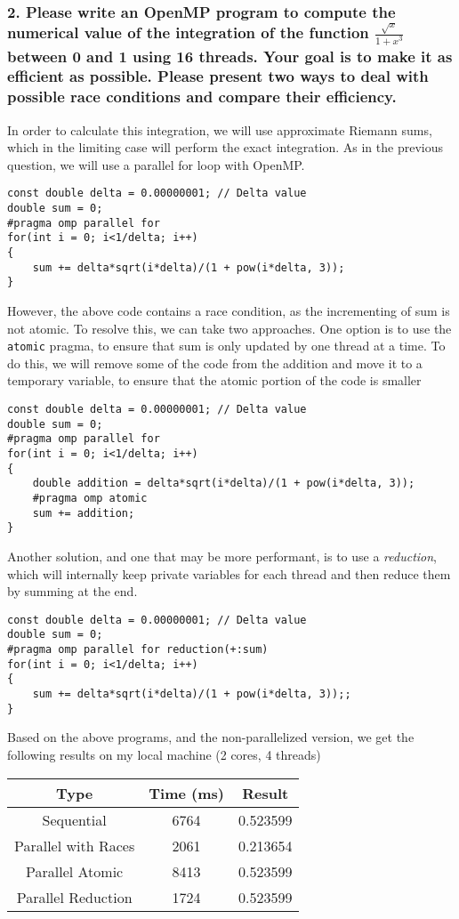 \documentclass[titlepage]{article}
\def\code#1{\texttt{#1}}
\begin{document}
\subsubsection*{2. Please write an OpenMP program to compute the numerical 
value of the integration of the function $\frac{\sqrt{x}}{1+x^3}$ between 0 
and 1 using 16 threads. Your goal is to make it as efficient as possible. 
Please present two ways to deal with possible race conditions and compare 
their efficiency.}
In order to calculate this integration, we will use approximate Riemann sums,
which in the limiting case will perform the exact integration. As in the
previous question, we will use a parallel for loop with OpenMP.
\begin{lstlisting}[style=CStyle]
const double delta = 0.00000001; // Delta value
double sum = 0;
#pragma omp parallel for
for(int i = 0; i<1/delta; i++)
{
    sum += delta*sqrt(i*delta)/(1 + pow(i*delta, 3));
}
\end{lstlisting}
However, the above code contains a race condition, as the incrementing of
sum is not atomic. To resolve this, we can take two approaches. One option
is to use the \code{atomic} pragma, to ensure that sum is only updated by
one thread at a time. To do this, we will remove some of the code from
the addition and move it to a temporary variable, to ensure that the atomic
portion of the code is smaller
\begin{minipage}{\linewidth}
\begin{lstlisting}[style=CStyle]
const double delta = 0.00000001; // Delta value
double sum = 0;
#pragma omp parallel for
for(int i = 0; i<1/delta; i++)
{
    double addition = delta*sqrt(i*delta)/(1 + pow(i*delta, 3));
    #pragma omp atomic
    sum += addition;
}
\end{lstlisting}
\end{minipage}
Another solution, and one that may be more performant, is to use a 
\textit{reduction}, which will internally keep private variables for each
thread and then reduce them by summing at the end.
\begin{lstlisting}[style=CStyle]
const double delta = 0.00000001; // Delta value
double sum = 0;
#pragma omp parallel for reduction(+:sum)
for(int i = 0; i<1/delta; i++)
{
    sum += delta*sqrt(i*delta)/(1 + pow(i*delta, 3));;
}
\end{lstlisting}
Based on the above programs, and the non-parallelized version,
we get the following results on my local machine (2 cores, 4 threads)
\begin{center}
    \begin{tabular}{ |c|c|c| } 
     \hline
     Type & Time (ms) & Result \\ 
     \hline
        Sequential & 6764 & 0.523599\\
        Parallel with Races & 2061 & 0.213654\\
        Parallel Atomic & 8413 & 0.523599\\
        Parallel Reduction & 1724 & 0.523599\\        
     \hline
    \end{tabular}
\end{center}
\end{document}
